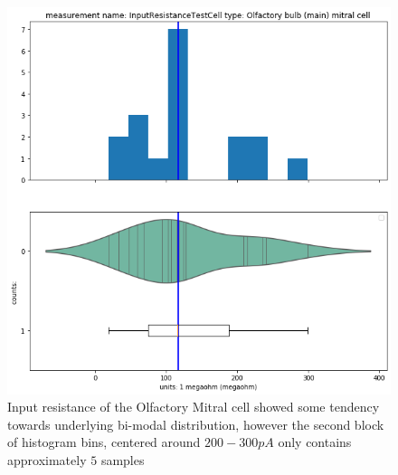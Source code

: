    \begin{figure}   
\begin{center}

   \includegraphics[scale=0.45]{notebooks_converted/needata_thesis_files/needata_thesis_5_21}
         \caption{Input resistance of the Olfactory Mitral cell showed some tendency towards underlying bi-modal distribution, however the second block of histogram bins, centered around $200-300pA$ only contains approximately $5$ samples}
\end{center}

   \end{figure}
   

